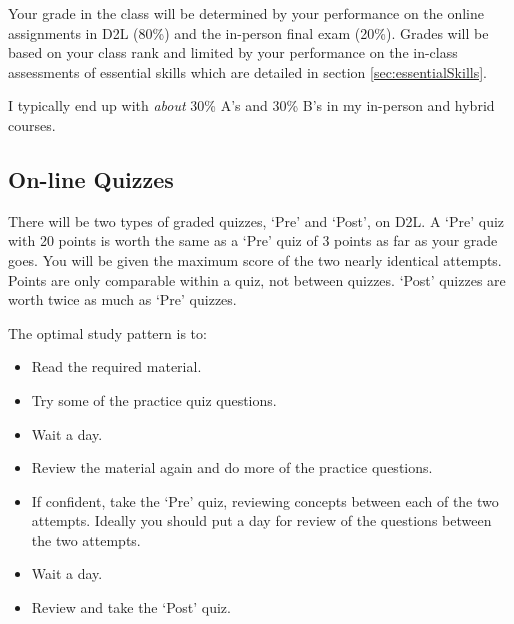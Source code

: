 \documentclass[letterpaper,10pt]{article}
\newif\ifonline
\begin{document}
\ifonline
  Your grade in the class will be determined by your performance on the online assignments in D2L (80\%) and the in-person final exam (20\%).  Grades will be based on your class rank.

  Only about 30\% of students enrolled at the start of term complete the online version of this course.  The typically grade distribution is often worse than the my in-person and hybrid courses where \emph{about} 30\% of students earn A's and another 30\% earn B's.

\else
  Your grade in the class will be determined by your performance on the online assignments in D2L (80\%) and the in-person final exam (20\%).  Grades will be based on your class rank and limited by your performance on the in-class assessments of essential skills which are detailed in section \ref{sec:essentialSkills}. 
  
  I typically end up with \emph{about} 30\%
  A's and 30\% B's in my in-person and hybrid courses.    
\fi

\subsection{On-line Quizzes}

There will be two types of graded quizzes, `Pre' and `Post', on D2L.  A `Pre'
quiz with 20 points is worth the same as a `Pre' quiz of 3 points as
far as your grade goes.  You will be given the maximum score of the two nearly identical attempts. Points are only comparable within a quiz, not between quizzes.  `Post' quizzes are worth twice as much as `Pre' quizzes.

\ifonline

  The optimal study pattern is to:
  \begin{itemize}
  \item Read the required material.
  \item Try some of the practice quiz questions.
  \item Wait a day.
  \item Review the material again and do more of the practice questions.
  \item If confident, take the `Pre' quiz, reviewing concepts between each of the two attempts. Ideally you should put a day for review of the questions between the two attempts.
  \item Wait a day.
  \item Review and take the `Post' quiz.
  \end{itemize}
\end{document}

